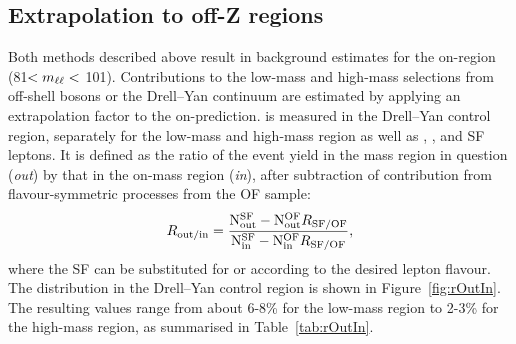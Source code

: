 \subsection{Extrapolation to off-Z regions}
Both methods described above result in background estimates for the on-\Z region (81\GeV $< m_{\ell\ell} < $ 101\GeV). Contributions to the low-mass and high-mass selections from off-shell \Z bosons or the Drell--Yan continuum are estimated by applying an extrapolation factor \Routin to the on-\Z prediction. \Routin is measured in the Drell--Yan control region, separately for the low-mass and high-mass region as well as \EE, \MM, and SF leptons. It is defined as the ratio of the event yield in the mass region in question (\textit{out}) by that in the on-\Z mass region (\textit{in}), after subtraction of contribution from flavour-symmetric processes from the OF sample:
\begin{equation}
R_\text{out/in} = \frac{\mathrm{N}_{\mathrm{out}}^{\mathrm{SF}} - \mathrm{N}_{\mathrm{out}}^{\mathrm{OF}}R_{\text{SF/OF}}}{ \mathrm{N}_{\mathrm{in}}^{\mathrm{SF}} - \mathrm{N}_{\mathrm{in}}^{\mathrm{OF}}R_{\text{SF/OF}}},
\end{equation} 
where the SF can be substituted for \EE or \MM according to the desired lepton flavour. The \mll distribution in the Drell--Yan control region is shown in Figure~\ref{fig:rOutIn}. The resulting values range from about 6-8\% for the low-mass region to 2-3\% for the high-mass region, as summarised in Table~\ref{tab:rOutIn}.
